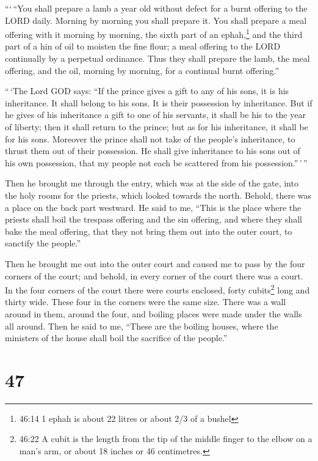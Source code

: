  ```\,``You shall prepare a lamb a year old without defect
for a burnt offering to the LORD daily. Morning by morning you shall
prepare it.  You shall prepare a meal offering with it
morning by morning, the sixth part of an ephah,\footnote{46:14 1 ephah
  is about 22 litres or about 2/3 of a bushel} and the third part of a
hin of oil to moisten the fine flour; a meal offering to the LORD
continually by a perpetual ordinance.  Thus they shall
prepare the lamb, the meal offering, and the oil, morning by morning,
for a continual burnt offering.''

 ``\,`The Lord GOD says: ``If the prince gives a gift to
any of his sons, it is his inheritance. It shall belong to his sons. It
is their possession by inheritance.  But if he gives of his
inheritance a gift to one of his servants, it shall be his to the year
of liberty; then it shall return to the prince; but as for his
inheritance, it shall be for his sons.  Moreover the prince
shall not take of the people's inheritance, to thrust them out of their
possession. He shall give inheritance to his sons out of his own
possession, that my people not each be scattered from his
possession.''\,'\,''

 Then he brought me through the entry, which was at the
side of the gate, into the holy rooms for the priests, which looked
towards the north. Behold, there was a place on the back part westward.
 He said to me, ``This is the place where the priests shall
boil the trespass offering and the sin offering, and where they shall
bake the meal offering, that they not bring them out into the outer
court, to sanctify the people.''

 Then he brought me out into the outer court and caused me
to pass by the four corners of the court; and behold, in every corner of
the court there was a court.  In the four corners of the
court there were courts enclosed, forty cubits\footnote{46:22 A cubit is
  the length from the tip of the middle finger to the elbow on a man's
  arm, or about 18 inches or 46 centimetres.} long and thirty wide.
These four in the corners were the same size.  There was a
wall around in them, around the four, and boiling places were made under
the walls all around.  Then he said to me, ``These are the
boiling houses, where the ministers of the house shall boil the
sacrifice of the people.''

\hypertarget{section-45}{%
\section{47}\label{section-45}}

